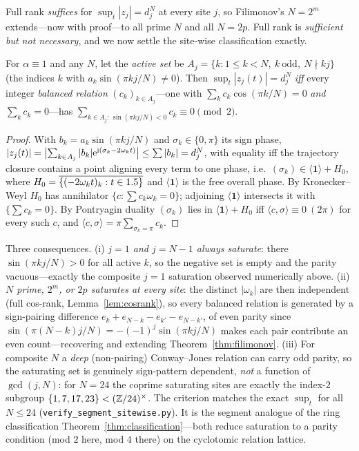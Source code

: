 \noindent Full rank \emph{suffices} for $\sup_t|z_j|=d_j^N$ at every site $j$, so Filimonov's $N=2^m$ extends---now
with proof---to all prime $N$ and all $N=2p$. Full rank is \emph{sufficient but not necessary}, and we now settle
the site-wise classification exactly.

\begin{proposition}\label{prop:segment-site}
For $\alpha\equiv1$ and any $N$, let the \emph{active set} be $A_j=\{k:1\le k<N,\ k\ \text{odd},\ N\nmid kj\}$
(the indices $k$ with $a_k\sin(\pi kj/N)\ne0$). Then $\sup_t|z_j(t)|=d_j^N$ \emph{iff} every integer
\emph{balanced relation} $(c_k)_{k\in A_j}$---one with $\sum_k c_k\cos(\pi k/N)=0$ \emph{and} $\sum_k c_k=0$---has
$\sum_{k\in A_j:\,\sin(\pi kj/N)<0}c_k\equiv0\pmod2$.
\end{proposition}

\begin{proof}
With $b_k=a_k\sin(\pi kj/N)$ and $\sigma_k\in\{0,\pi\}$ its sign phase,
$|z_j(t)|=\bigl|\sum_{k\in A_j}|b_k|\mathrm{e}^{\mathrm i(\sigma_k-2\omega_k t)}\bigr|\le\sum|b_k|=d_j^N$, with equality
iff the trajectory closure contains a point aligning every term to one phase, i.e.\
$(\sigma_k)\in\langle\mathbf1\rangle+H_0$, where $H_0=\overline{\{(-2\omega_k t)_k:t\in1.5\}}$ and
$\langle\mathbf1\rangle$ is the free overall phase. By Kronecker--Weyl $H_0$ has annihilator
$\{c:\sum c_k\omega_k=0\}$; adjoining $\langle\mathbf1\rangle$ intersects it with $\{\sum c_k=0\}$. By Pontryagin
duality $(\sigma_k)$ lies in $\langle\mathbf1\rangle+H_0$ iff $\langle c,\sigma\rangle\equiv0\ (2\pi)$ for every
such $c$, and $\langle c,\sigma\rangle=\pi\sum_{\sigma_k=\pi}c_k$.
\end{proof}

\noindent Three consequences. \textup{(i)} \emph{$j=1$ and $j=N-1$ always saturate}: there $\sin(\pi kj/N)>0$ for
all active $k$, so the negative set is empty and the parity vacuous---exactly the composite $j=1$ saturation
observed numerically above. \textup{(ii)} \emph{$N$ prime, $2^m$, or $2p$ saturates at every site}: the distinct
$|\omega_k|$ are then independent (full cos-rank, Lemma~\ref{lem:cosrank}), so every balanced relation is generated by a
sign-pairing difference $e_k+e_{N-k}-e_{k'}-e_{N-k'}$, of even parity since
$\sin(\pi(N-k)j/N)=-(-1)^j\sin(\pi kj/N)$ makes each pair contribute an even count---recovering and extending
Theorem~\ref{thm:filimonov}. \textup{(iii)} For composite $N$ a
\emph{deep} (non-pairing) Conway--Jones relation can carry odd parity, so the saturating set is genuinely
sign-pattern dependent, \emph{not} a function of $\gcd(j,N)$: for $N=24$ the coprime saturating sites are
exactly the index-$2$ subgroup $\{1,7,17,23\}<(\mathbb{Z}/24)^\times$. The criterion matches the exact $\sup_t$ for all
$N\le24$ (\texttt{verify\_segment\_sitewise.py}). It is the segment analogue of the ring classification
Theorem~\ref{thm:classification}---both reduce saturation to a parity condition (mod $2$ here, mod $4$ there) on
the cyclotomic relation lattice.

